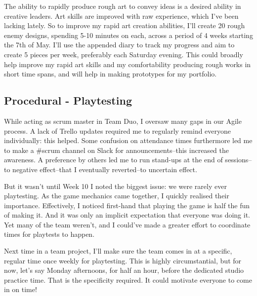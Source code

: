\documentclass{scrartcl}
\begin{document}
The ability to rapidly produce rough art to convey ideas is a desired ability in creative leaders. Art skills are improved with raw experience, which I've been lacking lately. So to improve my rapid art creation abilities, I'll create 20 rough enemy designs, spending 5-10 minutes on each, across a period of 4 weeks starting the 7th of May. I'll use the appended diary to track my progress and aim to create 5 pieces per week, preferably each Saturday evening. This could broadly help improve my rapid art skills and my comfortability producing rough works in short time spans, and will help in making prototypes for my portfolio.


\subsection{Procedural - Playtesting} %
While acting as scrum master in Team Duo, I oversaw many gaps in our Agile process. A lack of Trello updates required me to regularly remind everyone individually: this helped. Some confusion on attendance times furthermore led me to make a \#scrum channel on Slack for announcements--this increased the awareness. A preference by others led me to run stand-ups at the end of sessions--to negative effect--that I eventually reverted--to uncertain effect.

But it wasn't until Week 10 I noted the biggest issue: we were rarely ever playtesting. As the game mechanics came together, I quickly realised their importance. Effectively, I noticed first-hand that playing the game is half the fun of making it. And it was only an implicit expectation that everyone was doing it. Yet many of the team weren't, and I could've made a greater effort to coordinate times for playtests to happen.

Next time in a team project, I'll make sure the team comes in at a specific, regular time once weekly for playtesting. This is highly circumstantial, but for now, let's say Monday afternoons, for half an hour, before the dedicated studio practice time. That is the specificity required. It could motivate everyone to come in on time!


\end{document}
